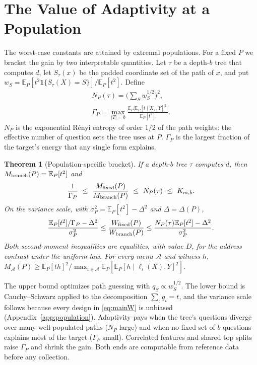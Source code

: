 \documentclass{article}
\newtheorem{theorem}{Theorem}
\newcommand{\E}{\mathbb{E}}
\newcommand{\A}{\mathcal A}
\begin{document}
\section{The Value of Adaptivity at a Population}\label{sec:population}
The worst-case constants are attained by extremal populations. For a fixed $P$ we bracket the gain by two interpretable quantities. Let $\tau$ be a depth-$b$ tree that computes $d$, let $S_\tau(x)$ be the padded coordinate set of the path of $x$, and put $w_S=\E_P[t^2\mathbf 1\{S_\tau(X)=S\}]/\E_P[t^2]$. Define
\begin{gather*}
 N_P(\tau)=\Big(\sum_Sw_S^{1/2}\Big)^2,\\
 \Gamma_P=\max_{|T|=b}\frac{\E_P\big[\E_P[t\mid X_T,Y]^2\big]}{\E_P[t^2]}.
\end{gather*}
$N_P$ is the exponential R\'enyi entropy of order $1/2$ of the path weights: the effective number of question sets the tree uses at $P$. $\Gamma_P$ is the largest fraction of the target's energy that any single form explains.

\begin{theorem}[Population-specific bracket]\label{thm:bracket}
If a depth-$b$ tree $\tau$ computes $d$, then $M_{\rm branch}(P)=\E_P[t^2]$ and
\[
 \frac1{\Gamma_P}\ \le\ \frac{M_{\rm fixed}(P)}{M_{\rm branch}(P)}\ \le\ N_P(\tau)\ \le\ K_{m,b}.
\]
On the variance scale, with $\sigma_P^2=\E_P[t^2]-\Delta^2$ and $\Delta=\Delta(P)$,
\[
 \frac{\E_P[t^2]/\Gamma_P-\Delta^2}{\sigma_P^2}\le\frac{W_{\rm fixed}(P)}{W_{\rm branch}(P)}\le\frac{N_P(\tau)\E_P[t^2]-\Delta^2}{\sigma_P^2}.
\]
Both second-moment inequalities are equalities, with value $D$, for the address contrast under the uniform law. For every menu $\A$ and witness $h$, $M_\A(P)\ge\E_P[th]^2/\max_{\iota\in\A}\E_P[\E_P[h\mid\ell_\iota(X),Y]^2]$.
\end{theorem}

The upper bound optimizes path guessing with $q_S\propto w_S^{1/2}$. The lower bound is Cauchy--Schwarz applied to the decomposition $\sum_\iota g_\iota=t$, and the variance scale follows because every design in \eqref{eq:mainW} is unbiased (Appendix~\ref{app:population}). Adaptivity pays when the tree's questions diverge over many well-populated paths ($N_P$ large) and when no fixed set of $b$ questions explains most of the target ($\Gamma_P$ small). Correlated features and shared top splits raise $\Gamma_P$ and shrink the gain. Both ends are computable from reference data before any collection.
\end{document}
